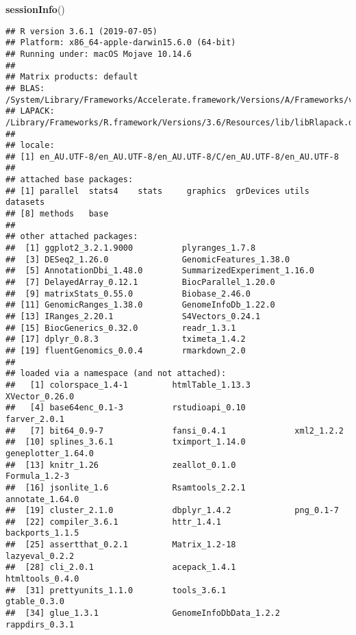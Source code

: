 \documentclass[
]{article}
\newenvironment{Shaded}{}{}
\newcommand{\KeywordTok}[1]{\textcolor[rgb]{0.00,0.44,0.13}{\textbf{#1}}}
\newcommand{\NormalTok}[1]{#1}
\begin{document}
\begin{Shaded}
\begin{Highlighting}[]
\KeywordTok{sessionInfo}\NormalTok{()}
\end{Highlighting}
\end{Shaded}

\begin{verbatim}
## R version 3.6.1 (2019-07-05)
## Platform: x86_64-apple-darwin15.6.0 (64-bit)
## Running under: macOS Mojave 10.14.6
## 
## Matrix products: default
## BLAS:   /System/Library/Frameworks/Accelerate.framework/Versions/A/Frameworks/vecLib.framework/Versions/A/libBLAS.dylib
## LAPACK: /Library/Frameworks/R.framework/Versions/3.6/Resources/lib/libRlapack.dylib
## 
## locale:
## [1] en_AU.UTF-8/en_AU.UTF-8/en_AU.UTF-8/C/en_AU.UTF-8/en_AU.UTF-8
## 
## attached base packages:
## [1] parallel  stats4    stats     graphics  grDevices utils     datasets 
## [8] methods   base     
## 
## other attached packages:
##  [1] ggplot2_3.2.1.9000          plyranges_1.7.8            
##  [3] DESeq2_1.26.0               GenomicFeatures_1.38.0     
##  [5] AnnotationDbi_1.48.0        SummarizedExperiment_1.16.0
##  [7] DelayedArray_0.12.1         BiocParallel_1.20.0        
##  [9] matrixStats_0.55.0          Biobase_2.46.0             
## [11] GenomicRanges_1.38.0        GenomeInfoDb_1.22.0        
## [13] IRanges_2.20.1              S4Vectors_0.24.1           
## [15] BiocGenerics_0.32.0         readr_1.3.1                
## [17] dplyr_0.8.3                 tximeta_1.4.2              
## [19] fluentGenomics_0.0.4        rmarkdown_2.0              
## 
## loaded via a namespace (and not attached):
##   [1] colorspace_1.4-1         htmlTable_1.13.3         XVector_0.26.0          
##   [4] base64enc_0.1-3          rstudioapi_0.10          farver_2.0.1            
##   [7] bit64_0.9-7              fansi_0.4.1              xml2_1.2.2              
##  [10] splines_3.6.1            tximport_1.14.0          geneplotter_1.64.0      
##  [13] knitr_1.26               zeallot_0.1.0            Formula_1.2-3           
##  [16] jsonlite_1.6             Rsamtools_2.2.1          annotate_1.64.0         
##  [19] cluster_2.1.0            dbplyr_1.4.2             png_0.1-7               
##  [22] compiler_3.6.1           httr_1.4.1               backports_1.1.5         
##  [25] assertthat_0.2.1         Matrix_1.2-18            lazyeval_0.2.2          
##  [28] cli_2.0.1                acepack_1.4.1            htmltools_0.4.0         
##  [31] prettyunits_1.1.0        tools_3.6.1              gtable_0.3.0            
##  [34] glue_1.3.1               GenomeInfoDbData_1.2.2   rappdirs_0.3.1          

\end{verbatim}
\end{document}
